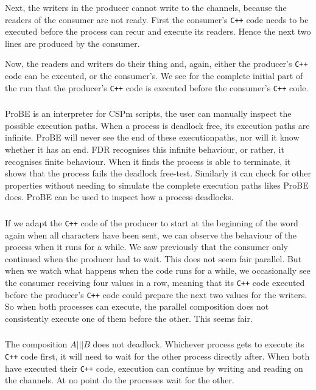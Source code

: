 \documentclass[a4paper,twoside,11pt]{article}
\newcommand{\cpp}{{\tt C++} }
\begin{document}
Next, the writers in the producer cannot write to the channels, because the readers of the consumer are not ready. First the consumer's \cpp code needs to be executed before the process can recur and execute its readers. Hence the next two lines are produced by the consumer.

Now, the readers and writers do their thing and, again, either the producer's \cpp code can be executed, or the consumer's. We see for the complete initial part of the run that the producer's \cpp code is executed before the consumer's \cpp code.

\subsubsection{}
ProBE is an interpreter for CSPm scripts, the user can manually inspect the possible execution paths. When a process is deadlock free, its execution paths are infinite. ProBE will never see the end of these executionpaths, nor will it know whether it has an end. FDR recognises this infinite behaviour, or rather, it recognises finite behaviour. When it finds the process is able to terminate, it shows that the process fails the deadlock free-test. Similarly it can check for other properties without needing to simulate the complete execution paths likes ProBE does. ProBE can be used to inspect how a process deadlocks.

\subsubsection{}
If we adapt the \cpp code of the producer to start at the beginning of the word again when all characters have been sent, we can observe the behaviour of the process when it runs for a while. We saw previously that the consumer only continued when the producer had to wait. This does not seem fair parallel. But when we watch what happens when the code runs for a while, we occasionally see the consumer receiving four values in a row, meaning that its \cpp code executed before the producer's \cpp code could prepare the next two values for the writers. So when both processes can execute, the parallel composition does not consistently execute one of them before the other. This seems fair.


\subsubsection{}
The composition $A ||| B$ does not deadlock. Whichever process gets to execute its \cpp code first, it will need to wait for the other process directly after. When both have executed their \cpp code, execution can continue by writing and reading on the channels. At no point do the processes wait for the other.
\end{document}
